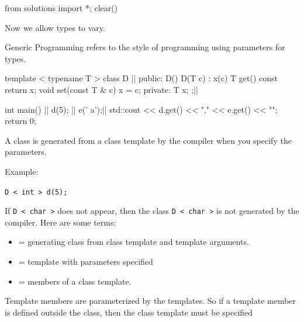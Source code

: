 \begin{python0}
from solutions import *; clear()
\end{python0}

Now we allow types to vary.

Generic Programming refers to the style of programming using parameters
for types.

\begin{consolethree}[escapeinside=||]
template < typename T >
class D {||
public:
     D(){}
     D(T c) : x(c) {}
     T get() const { return x; }
     void set(const T & c) { x = c; }
private:
     T x;
};||

int main()
{   
    || d(5);
    || e(' a');||
    std::cout << d.get() << ","
              << e.get() << "\n";
    return 0;
} 
\end{consolethree}
A class is generated from a class template by the compiler when you
specify the parameters.

Example:

\verb!D < int > d(5);!

If \texttt{D < char >} does not appear, then the
class \texttt{D < char >} is not generated by the
compiler. Here are some terms:

\begin{itemize}
\item
   = generating class from class template and template arguments.
\item
   = template with parameters specified
\item
   = members of a class template.
\end{itemize}

Template members are parameterized by the templates. So if a template
member is defined outside the class, then the class template must be
specified


